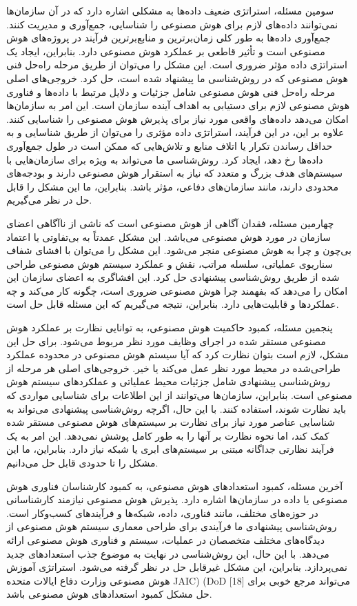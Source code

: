 \documentclass[a4paper,10pt]{article}
\begin{document}
                    سومین مسئله، استراتژی ضعیف داده‌ها به مشکلی اشاره دارد که در آن سازمان‌ها نمی‌توانند داده‌های لازم برای هوش مصنوعی را شناسایی، جمع‌آوری و مدیریت کنند. جمع‌آوری داده‌ها به طور کلی زمان‌برترین و منابع‌برترین فرآیند در پروژه‌های هوش مصنوعی است و تأثیر قاطعی بر عملکرد هوش مصنوعی دارد. بنابراین، ایجاد یک استراتژی داده مؤثر ضروری است. این مشکل را می‌توان از طریق مرحله راه‌حل فنی هوش مصنوعی که در روش‌شناسی ما پیشنهاد شده است، حل کرد. خروجی‌های اصلی مرحله راه‌حل فنی هوش مصنوعی شامل جزئیات و دلایل مرتبط با داده‌ها و فناوری هوش مصنوعی لازم برای دستیابی به اهداف آینده سازمان است. این امر به سازمان‌ها امکان می‌دهد داده‌های واقعی مورد نیاز برای پذیرش هوش مصنوعی را شناسایی کنند. علاوه بر این، در این فرآیند، استراتژی داده مؤثری را می‌توان از طریق شناسایی و به حداقل رساندن تکرار یا اتلاف منابع و تلاش‌هایی که ممکن است در طول جمع‌آوری داده‌ها رخ دهد، ایجاد کرد. روش‌شناسی ما می‌تواند به ویژه برای سازمان‌هایی با سیستم‌های هدف بزرگ و متعدد که نیاز به استقرار هوش مصنوعی دارند و بودجه‌های محدودی دارند، مانند سازمان‌های دفاعی، مؤثر باشد. بنابراین، ما این مشکل را قابل حل در نظر می‌گیریم.

                    چهارمین مسئله، فقدان آگاهی از هوش مصنوعی است که ناشی از ناآگاهی اعضای سازمان در مورد هوش مصنوعی می‌باشد. این مشکل عمدتاً به بی‌تفاوتی یا اعتماد بی‌چون و چرا به هوش مصنوعی منجر می‌شود. این مشکل را می‌توان با افشای شفاف سناریوی عملیاتی، سلسله مراتب، نقش و عملکرد سیستم هوش مصنوعی طراحی شده از طریق روش‌شناسی پیشنهادی حل کرد. این افشاگری به اعضای سازمان این امکان را می‌دهد که بفهمند چرا هوش مصنوعی ضروری است، چگونه کار می‌کند و چه عملکردها و قابلیت‌هایی دارد. بنابراین، نتیجه می‌گیریم که این مسئله قابل حل است.

                    پنجمین مسئله، کمبود حاکمیت هوش مصنوعی، به توانایی نظارت بر عملکرد هوش مصنوعی مستقر شده در اجرای وظایف مورد نظر مربوط می‌شود. برای حل این مشکل، لازم است بتوان نظارت کرد که آیا سیستم هوش مصنوعی در محدوده عملکرد طراحی‌شده در محیط مورد نظر عمل می‌کند یا خیر. خروجی‌های اصلی هر مرحله از روش‌شناسی پیشنهادی شامل جزئیات محیط عملیاتی و عملکردهای سیستم هوش مصنوعی است. بنابراین، سازمان‌ها می‌توانند از این اطلاعات برای شناسایی مواردی که باید نظارت شوند، استفاده کنند. با این حال، اگرچه روش‌شناسی پیشنهادی می‌تواند به شناسایی عناصر مورد نیاز برای نظارت بر سیستم‌های هوش مصنوعی مستقر شده کمک کند، اما نحوه نظارت بر آنها را به طور کامل پوشش نمی‌دهد. این امر به یک فرآیند نظارتی جداگانه مبتنی بر سیستم‌های ابری یا شبکه نیاز دارد. بنابراین، ما این مشکل را تا حدودی قابل حل می‌دانیم.

                    آخرین مسئله، کمبود استعدادهای هوش مصنوعی، به کمبود کارشناسان فناوری هوش مصنوعی یا داده در سازمان‌ها اشاره دارد. پذیرش هوش مصنوعی نیازمند کارشناسانی در حوزه‌های مختلف، مانند فناوری، داده، شبکه‌ها و فرآیندهای کسب‌وکار است. روش‌شناسی پیشنهادی ما فرآیندی برای طراحی معماری سیستم هوش مصنوعی از دیدگاه‌های مختلف متخصصان در عملیات، سیستم و فناوری هوش مصنوعی ارائه می‌دهد. با این حال، این روش‌شناسی در نهایت به موضوع جذب استعدادهای جدید نمی‌پردازد. بنابراین، این مشکل غیرقابل حل در نظر گرفته می‌شود. استراتژی آموزش هوش مصنوعی وزارت دفاع ایالات متحده JAIC) (DoD [18] می‌تواند مرجع خوبی برای حل مشکل کمبود استعدادهای هوش مصنوعی باشد.
\end{document}
